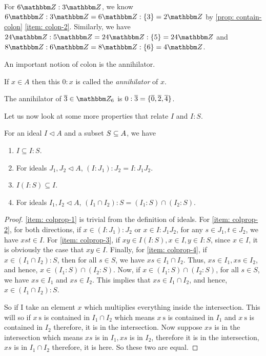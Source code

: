 \begin{example}
    For $6 {\Z}: 3 {\Z}$, we know $6 {\Z}: 3 {\Z} = 6 {\Z}: \{3\} = 2 {\Z}$ by \cref{prop: contain-colon} \eqref{item: colon-2}. Similarly, we have 
    $24 {\Z}: 5 {\Z} = 24 {\Z}: \{5\} = 24 {\Z}$ and $8 {\Z}: 6 {\Z} = 8 {\Z}: \{6\} = 4 {\Z}$.
\end{example}

An important notion of colon is the annihilator.

\begin{definition}
    If $x \in A$ then this $0: x$ is called the {\it annihilator} of $x$.
\end{definition} 

\begin{example}
    The annihilator of $\ol{3} \in \Z_6$ is  $0: \ol{3} = \{\ol{0}, \ol{2}, \ol{4}\}$. 
\end{example}
Let us now look at some more properties that relate $I$ and $I: S$.
\begin{proposition}\label{prop: colon-properties}
    For an ideal $I \lhd A$ and a subset $S \ss A$, we have
    \begin{enumerate}
        \item \label{item: colprop-1}$I \subseteq I: S$.
        \item \label{item: colprop-2}For ideals $J_{1}, J_{2} \lhd A$, $\left(I: J_{1}\right): J_{2}=I: J_{1} J_{2}$.
        \item \label{item: colprop-3}$I(I: S) \subseteq I$.
        \item \label{item: colprop-4}For ideals $I_{1}, I_{2} \lhd A$, $\left(I_{1} \cap I_{2}\right): S=\left(I_{1}: S\right) \cap\left(I_{2}: S\right)$.
    \end{enumerate}
\end{proposition}
\begin{proof}
\eqref{item: colprop-1} is trivial from the definition of ideals. For \eqref{item: colprop-2}, for both directions, if $x \in \left(I: J_{1}\right): J_{2}$ or $x \in I: J_{1} J_{2}$, for any $s \in J_1, t \in J_2$, we have $xst \in I$. For \eqref{item: colprop-3}, if $xy \in I(I:S), x \in I, y \in I:S$, since $x \in I$, it is obviously the case that $xy \in I$. Finally, for \eqref{item: colprop-4}, if $x \in (I_1\cap I_2):S$, then for all $s \in S$, we have $xs \in I_1\cap I_2$. Thus, $xs \in I_1, xs \in I_2$, and hence, $x \in \left(I_{1}: S\right) \cap\left(I_{2}: S\right)$. Now, if $x \in \left(I_{1}: S\right) \cap\left(I_{2}: S\right)$, for all $s \in S$, we have $xs \in I_1$ and $xs \in I_2$. This implies that $xs \in I_1 \cap I_2$, and hence, $x \in \left(I_{1} \cap I_{2}\right): S$. 

So if I take an element $x$ which multiplies everything inside the intersection. This will so if $x \mathrm{~s}$ is contained in $I_{1} \cap I_{2}$ which means $x \mathrm{~s}$ is contained in $I_{1}$ and $x \mathrm{~s}$ is contained in $I_{2}$ therefore, it is in the intersection. Now suppose $x s$ is in the intersection which means $x s$ is in $I_{1}, x s$ is in $I_{2}$, therefore it is in the intersection, $x s$ is in $I_{1} \cap I_{2}$ therefore, it is here. So these two are equal. 
\end{proof}
